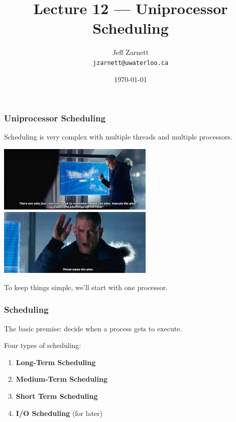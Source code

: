 

\title{Lecture 12 --- Uniprocessor Scheduling }

\author{Jeff Zarnett \\ \small \texttt{jzarnett@uwaterloo.ca}}
\date{\today}




\begin{frame}
  \titlepage

 \end{frame}



\begin{frame}
\frametitle{Uniprocessor Scheduling}

Scheduling is very complex with multiple threads and multiple processors.

\begin{center}
	\includegraphics[width=0.56\textwidth]{images/makeplan.jpg}
\end{center}

To keep things simple, we'll start with one processor.


\end{frame}


\begin{frame}
\frametitle{Scheduling}

The basic premise: decide when a process gets to execute. 

Four types of scheduling: 

\begin{enumerate}
	\item \textbf{Long-Term Scheduling}
	\item \textbf{Medium-Term Scheduling}
	\item \textbf{Short Term Scheduling}
	\item \textbf{I/O Scheduling} (for later)
\end{enumerate}

\end{frame}



